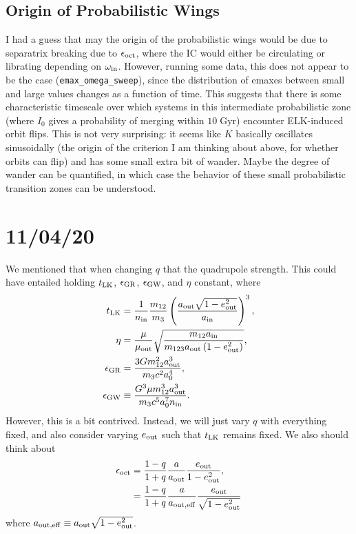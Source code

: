 \documentclass[11pt,
        usenames, %
        dvipsnames %
    ]{article}
\newcommand*{\p}[1]{\left(#1\right)}
\begin{document}
\subsection{Origin of Probabilistic Wings}

I had a guess that may the origin of the probabilistic wings would be due to
separatrix breaking due to $\epsilon_{\rm oct}$, where the IC would either be
circulating or librating depending on $\omega_{\rm in}$. However, running some
data, this does not appear to be the case (\lstinline{emax_omega_sweep}), since
the distribution of emaxes between small and large values changes as a function
of time. This suggests that there is some characteristic timescale over which
systems in this intermediate probabilistic zone (where $I_0$ gives a probability
of merging within $10\;\mathrm{Gyr}$) encounter ELK-induced orbit flips. This is
not very surprising: it seems like $K$ basically oscillates sinusoidally (the
origin of the criterion I am thinking about above, for whether orbits can flip)
and has some small extra bit of wander. Maybe the degree of wander can be
quantified, in which case the behavior of these small probabilistic transition
zones can be understood.

\section{11/04/20}

We mentioned that when changing $q$ that the quadrupole strength. This could
have entailed holding $t_{\rm LK}$, $\epsilon_{\rm GR}$, $\epsilon_{\rm GW}$,
and $\eta$ constant, where
\begin{align}
    t_{\rm LK} &= \frac{1}{n_{\rm in}}\frac{m_{12}}{m_3}\p{\frac{a_{\rm out}\sqrt{1 -
        e_{\rm out}^2}}{a_{\rm in}}}^3,\\
    \eta &= \frac{\mu}{\mu_{\rm out}} \sqrt{\frac{m_{12}a_{\rm in}}{
        m_{123}a_{\rm out}\p{1 - e_{\rm out}^2}}},\\
    \epsilon_{\rm GR} &= \frac{3Gm_{12}^2a_{\rm out}^3}{m_3c^2a_0^4},\\
    \epsilon_{\rm GW} &\equiv \frac{G^3\mu m_{12}^3
        a_{\rm out}^3}{m_3c^5a_0^7 n_{\rm in}}.
\end{align}
However, this is a bit contrived. Instead, we will just vary $q$ with everything
fixed, and also consider varying $e_{\rm out}$ such that $t_{\rm LK}$ remains
fixed. We also should think about
\begin{align}
    \epsilon_{\rm oct} &= \frac{1 - q}{1 + q}\frac{a}{a_{\rm out}}
        \frac{e_{\rm out}}{1 - e_{\rm out}^2},\\
        &= \frac{1 - q}{1 + q}\frac{a}{a_{\rm out, eff}}
        \frac{e_{\rm out}}{\sqrt{1 - e_{\rm out}^2}}
\end{align}
where $a_{\rm out, eff} \equiv a_{\rm out}\sqrt{1 - e_{\rm out}^2}$.
\end{document}
